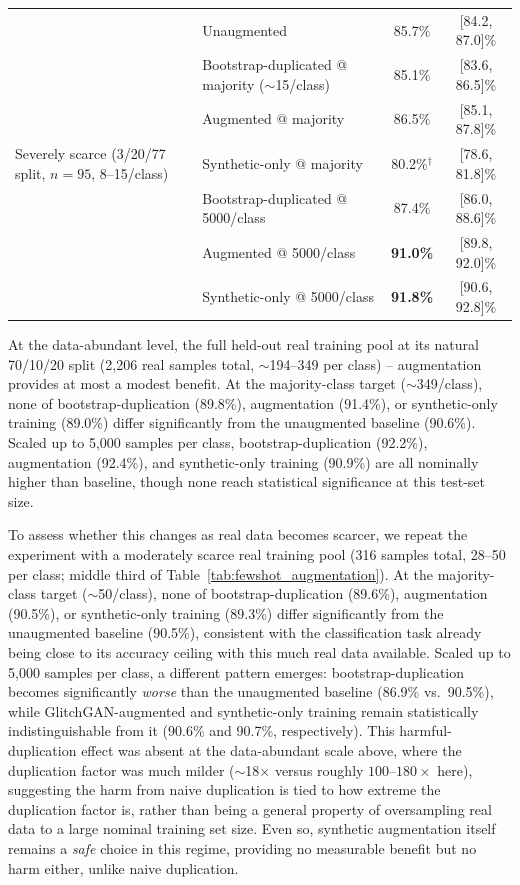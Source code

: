 \documentclass[reprint,nofootinbib,amsmath,amssymb,aps,floatfix]{revtex4-2}
\begin{document}
\begin{table}[t]
\begin{tabular}{llcc}
\midrule
\multirow{7}{*}{Severely scarce (3/20/77 split, $n=95$, 8--15/class)}
 & Unaugmented                                          & 85.7\% & [84.2, 87.0]\% \\
 & Bootstrap-duplicated @ majority ($\sim$15/class)      & 85.1\% & [83.6, 86.5]\% \\
 & Augmented @ majority                                 & 86.5\% & [85.1, 87.8]\% \\
 & Synthetic-only @ majority                             & 80.2\%$^\dagger$ & [78.6, 81.8]\% \\
 & Bootstrap-duplicated @ 5000/class                     & 87.4\% & [86.0, 88.6]\% \\
 & Augmented @ 5000/class                                & \textbf{91.0\%} & [89.8, 92.0]\% \\
 & Synthetic-only @ 5000/class                           & \textbf{91.8\%} & [90.6, 92.8]\% \\
\bottomrule
\end{tabular}
\end{table}

At the data-abundant level, the full held-out real training pool at its natural 70/10/20 split (2{,}206 real samples total, $\sim$194--349 per class) -- augmentation provides at most a modest benefit. At the majority-class target ($\sim$349/class), none of bootstrap-duplication (89.8\%), augmentation (91.4\%), or synthetic-only training (89.0\%) differ significantly from the unaugmented baseline (90.6\%). Scaled up to 5{,}000 samples per class, bootstrap-duplication (92.2\%), augmentation (92.4\%), and synthetic-only training (90.9\%) are all nominally higher than baseline, though none reach statistical significance at this test-set size.

To assess whether this changes as real data becomes scarcer, we repeat the experiment with a moderately scarce real training pool (316 samples total, 28--50 per class; middle third of Table~\ref{tab:fewshot_augmentation}). At the majority-class target ($\sim$50/class), none of bootstrap-duplication (89.6\%), augmentation (90.5\%), or synthetic-only training (89.3\%) differ significantly from the unaugmented baseline (90.5\%), consistent with the classification task already being close to its accuracy ceiling with this much real data available. Scaled up to 5{,}000 samples per class, a different pattern emerges: bootstrap-duplication becomes significantly \emph{worse} than the unaugmented baseline (86.9\% vs.\ 90.5\%), while GlitchGAN-augmented and synthetic-only training remain statistically indistinguishable from it (90.6\% and 90.7\%, respectively). This harmful-duplication effect was absent at the data-abundant scale above, where the duplication factor was much milder ($\sim$18$\times$ versus roughly $100$--$180\times$ here), suggesting the harm from naive duplication is tied to how extreme the duplication factor is, rather than being a general property of oversampling real data to a large nominal training set size. Even so, synthetic augmentation itself remains a \emph{safe} choice in this regime, providing no measurable benefit but no harm either, unlike naive duplication.
\end{document}

